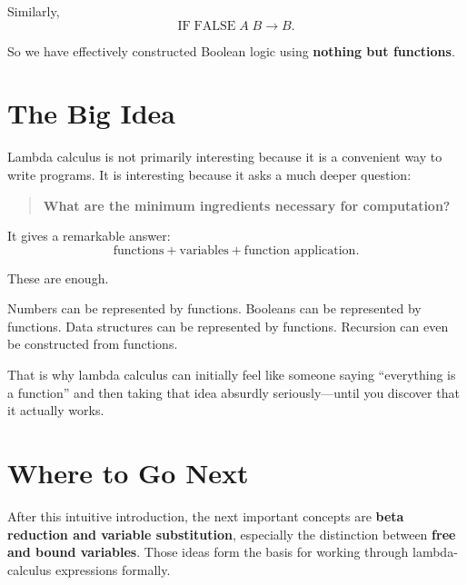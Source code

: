 \documentclass[11pt]{article}
\begin{document}
Similarly,
\[
\mathrm{IF}\;\mathrm{FALSE}\;A\;B \longrightarrow B.
\]

So we have effectively constructed Boolean logic using
\textbf{nothing but functions}.

\section{The Big Idea}

Lambda calculus is not primarily interesting because it is a convenient
way to write programs. It is interesting because it asks a much deeper
question:

\begin{quote}
\textbf{What are the minimum ingredients necessary for computation?}
\end{quote}

It gives a remarkable answer:
\[
\boxed{\text{functions}+\text{variables}+\text{function application}}.
\]

These are enough.

Numbers can be represented by functions. Booleans can be represented by
functions. Data structures can be represented by functions. Recursion
can even be constructed from functions.

That is why lambda calculus can initially feel like someone saying
``everything is a function'' and then taking that idea absurdly
seriously---until you discover that it actually works.

\section{Where to Go Next}

After this intuitive introduction, the next important concepts are
\textbf{beta reduction and variable substitution}, especially the
distinction between \textbf{free and bound variables}. Those ideas form
the basis for working through lambda-calculus expressions formally.
\end{document}
